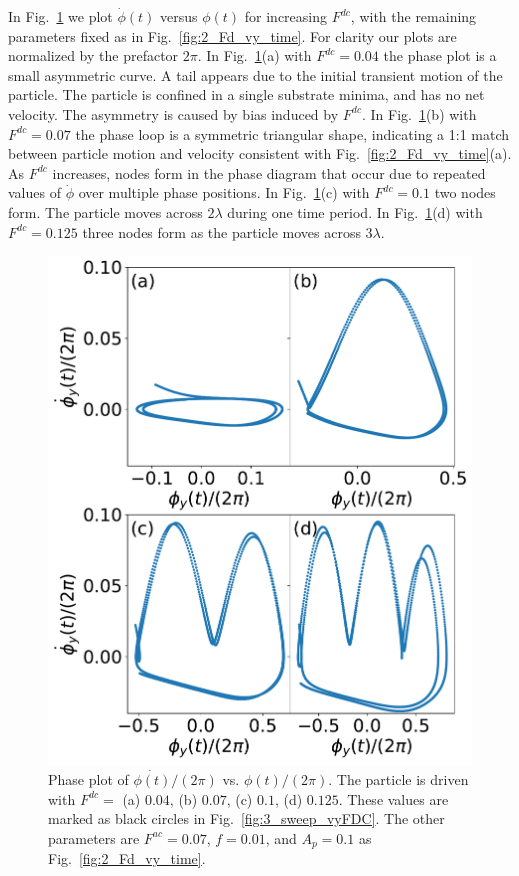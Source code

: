 \documentclass[twocolumn,showpacs,preprintnumbers,amsmath,amssymb,aps,prb]{revtex4}
\begin{document}
  In Fig.~\ref{fig:4_phase}
  we plot $\dot{\phi}(t)$ versus $\phi(t)$
  for increasing 
  $F^{dc}$, 
  with the remaining parameters fixed as in Fig.~\ref{fig:2_Fd_vy_time}.
  For clarity our plots are normalized by the prefactor $2\pi$. 
  In Fig.~\ref{fig:4_phase}(a) with
  $F^{dc} = 0.04$
  the phase plot is a small asymmetric curve.
  A tail appears
  due to the initial transient
  motion of the particle.
  The particle is confined in a single
  substrate minima,
  and has no net velocity.
  The asymmetry is caused by bias induced by $F^{dc}$.
  In Fig.~\ref{fig:4_phase}(b)
  with $F^{dc} = 0.07$
  the phase loop is a symmetric triangular shape,
  indicating a 1:1 match between
  particle motion and velocity consistent with 
  Fig.~\ref{fig:2_Fd_vy_time}(a).
  As $F^{dc}$ 
  increases,
  nodes form in the phase diagram
  that occur due to repeated values
  of $\dot{\phi}$ over multiple phase positions.
  In Fig.~\ref{fig:4_phase}(c)
  with $F^{dc} = 0.1$
  two nodes form.
  The particle moves across $2\lambda$
  during one time period.
  In Fig.~\ref{fig:4_phase}(d)
  with $F^{dc} = 0.125$
  three nodes form as the particle moves across $3\lambda$.
    \begin{figure} %
      \centering
      \includegraphics[width=\columnwidth]{fig4_phase.pdf}
      \caption{
        Phase plot of $\dot{\phi(t)}/(2\pi)$ vs. $\phi(t)/(2\pi)$.
        The particle is driven with $F^{dc} = $ (a) $0.04$, (b) $0.07$, (c) $0.1$, (d) $0.125$.  These values are marked as black circles
        in Fig.~\ref{fig:3_sweep_vyFDC}. 
      The other parameters
      are $F^{ac} = 0.07$, $f=0.01$, and $A_p = 0.1$
      as Fig.~\ref{fig:2_Fd_vy_time}.}
      \label{fig:4_phase}
    \end{figure}
\end{document}
